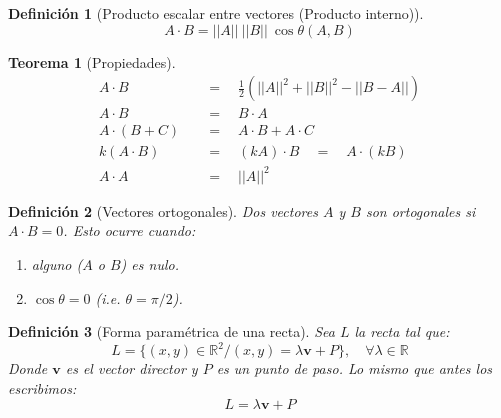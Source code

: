 \documentclass[12pt,a4paper]{extarticle}
\newtheorem{teo}{Teorema}[section]
\newtheorem{mydef}{Definici\'on}[section]
\renewcommand{\b}[1]{\mathbf{#1}}
\begin{document}
\begin{mydef}[Producto escalar entre vectores (Producto interno)]
  \[A \cdot B = ||A|| \ ||B|| \ \cos{\theta (A,B)}\]
\end{mydef}
\begin{teo}[Propiedades]

  \begin{align}
    A \cdot B \quad &= \quad  \frac{1}{2}(||A||^2 + ||B||^2 - ||B - A||)\\
    A \cdot B \quad &= \quad  B \cdot A\\
    A \cdot ( B + C ) \quad &= \quad  A \cdot B + A \cdot C \\
    k (A \cdot B) \quad &= \quad  (kA) \cdot B \quad = \quad A \cdot (kB) \\
    A \cdot A \quad &= \quad  ||A||^2
  \end{align}
\end{teo}

\begin{mydef}[Vectores ortogonales]
  Dos vectores \(A\) y \(B\) son ortogonales si \(A \cdot B = 0\). Esto
  ocurre cuando:
  \begin{enumerate}
  \item alguno (\(A\) o \(B\)) es nulo.
  \item \(\cos{\theta} = 0\) (i.e. \(\theta = \pi/2\)).
  \end{enumerate}
\end{mydef}

\begin{mydef}[Forma param\'etrica de una recta]
  Sea \(L\) la recta tal que:
  \[ L = \{ (x, y) \in \mathbb{R}^2 / (x,y) = \lambda \b{v} + P \}, \quad
  \forall \lambda \in \mathbb{R}
  \]
  Donde \(\b{v}\) es el \emph{vector director} y \(P\) es un \emph{punto
    de paso}. Lo mismo que antes los escribimos:
  \[L = \lambda \b{v} + P\]
\end{mydef}
\end{document}

